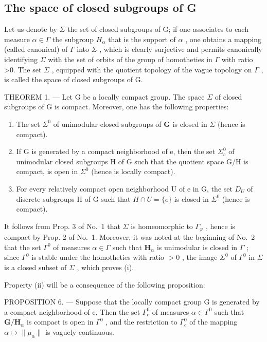 \subsection{The space of closed subgroups of G}

Let us denote by \(\Sigma\) the set of closed subgroups of G; if one associates to each measure \(\alpha\in\Gamma\) the subgroup \(H_{\alpha}\) that is the support of \(\alpha\) , one obtains a mapping (called canonical) of \(\Gamma\) into \(\Sigma\) , which is clearly surjective and permits canonically identifying \(\Sigma\) with the set of orbits of the group of homotheties in \(\Gamma\) with ratio \textgreater0. The set \(\Sigma\) , equipped with the quotient topology of the vague topology on \(\Gamma\) , is called the space of closed subgroups of G.

THEOREM 1. --- Let G be a locally compact group. The space \(\Sigma\) of closed subgroups of G is compact. Moreover, one has the following properties:

\begin{enumerate}
\def\labelenumi{(\roman{enumi})}
\item
  The set \(\Sigma^0\) of unimodular closed subgroups of \(\mathbf{G}\) is closed in \(\Sigma\) (hence is compact).
\item
  If G is generated by a compact neighborhood of e, then the set \(\Sigma_{c}^{0}\) of unimodular closed subgroups H of G such that the quotient space G/H is compact, is open in \(\Sigma^{0}\) (hence is locally compact).
\item
  For every relatively compact open neighborhood U of e in G, the set \(D_{U}\) of discrete subgroups H of G such that \(H \cap U = \{e\}\) is closed in \(\Sigma^{0}\) (hence is compact).
\end{enumerate}

It follows from Prop. 3 of No.~1 that \(\Sigma\) is homeomorphic to \(\Gamma_{\varphi}\) , hence is compact by Prop. 2 of No.~1. Moreover, it was noted at the beginning of No.~2 that the set \(\Gamma^0\) of measures \(\alpha \in \Gamma\) such that \(\mathbf{H}_{\alpha}\) is unimodular is closed in \(\Gamma\) ; since \(\Gamma^0\) is stable under the homotheties with ratio \(>0\) , the image \(\Sigma^0\) of \(\Gamma^0\) in \(\Sigma\) is a closed subset of \(\Sigma\) , which proves (i).

Property (ii) will be a consequence of the following proposition:

PROPOSITION 6. --- Suppose that the locally compact group G is generated by a compact neighborhood of e. Then the set \(\Gamma_{c}^{0}\) of measures \(\alpha\in\Gamma^{0}\) such that \(\mathbf{G} / \mathbf{H}_{\alpha}\) is compact is open in \(\Gamma^0\) , and the restriction to \(\Gamma_c^0\) of the mapping \(\alpha \mapsto \| \mu_{\alpha}\|\) is vaguely continuous.

